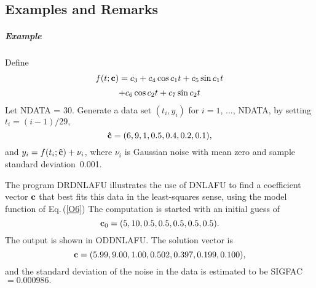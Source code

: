 \documentclass[twoside]{MATH77}
\begin{document}
\subsection{Examples and Remarks}

\subparagraph{Example}

Define
\begin{multline}
\label{O6}
f(t;{\bf c})=c_3+c_4\cos c_1t+c_5\sin c_1t\vspace{2pt}\\
+c_6\cos c_2t+c_7\sin c_2t
\end{multline}
Let NDATA = 30. Generate a data set $(t_i,y_i)$ for $i=1$, ..., NDATA, by
setting $t_i=(i-1)/29,$%
\begin{equation*}
{\bf \hat c}=(6,9,1,0.5,0.4,0.2,0.1),
\end{equation*}
and $y_i=f(t_i;{\bf \hat c})+\nu _i$, where $\nu _i$ is Gaussian noise with
mean zero and sample standard deviation~0.001.

The program DRDNLAFU illustrates the use of DNLAFU to find a coefficient
vector ${\bf c}$ that best fits this data in the least-squares sense, using
the model function of Eq.\,(\ref{O6}) The computation is started with an
initial guess of\vspace{-2pt}%
\begin{equation*}
{\bf c}_0=(5,10,0.5,0.5,0.5,0.5,0.5).
\end{equation*}
The output is shown in ODDNLAFU. The solution vector is\vspace{-2pt}%
\begin{equation*}
{\bf c}=(5.99,9.00,1.00,0.502,0.397,0.199,0.100),
\end{equation*}
and the standard deviation of the noise in the data is estimated to be
SIGFAC $=0.000986.$
\end{document}
